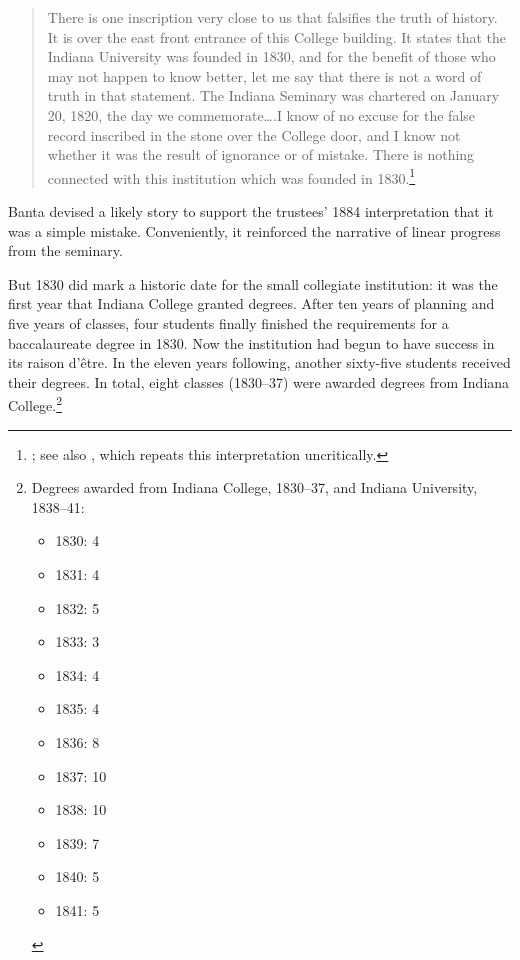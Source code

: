 \documentclass[
  american,
  letterpaper,
]{scrreprt}
\providecommand{\tightlist}{%
  \setlength{\itemsep}{0pt}\setlength{\parskip}{0pt}}\usepackage{longtable,booktabs,array}
\begin{document}
\begin{quote}
There is one inscription very close to us that falsifies the truth of
history. It is over the east front entrance of this College building. It
states that the Indiana University was founded in 1830, and for the
benefit of those who may not happen to know better, let me say that
there is not a word of truth in that statement. The Indiana Seminary was
chartered on January 20, 1820, the day we commemorate\ldots.I know of no
excuse for the false record inscribed in the stone over the College
door, and I know not whether it was the result of ignorance or of
mistake. There is nothing connected with this institution which was
founded in 1830.\footnote{; see also
  , which repeats this interpretation
  uncritically.}
\end{quote}

Banta devised a likely story to support the trustees' 1884
interpretation that it was a simple mistake. Conveniently, it reinforced
the narrative of linear progress from the seminary.

But 1830 did mark a historic date for the small collegiate institution:
it was the first year that Indiana College granted degrees. After ten
years of planning and five years of classes, four students finally
finished the requirements for a baccalaureate degree in 1830. Now the
institution had begun to have success in its raison d'être. In the
eleven years following, another sixty-five students received their
degrees. In total, eight classes (1830--37) were awarded degrees from
Indiana College.\footnote{Degrees awarded from Indiana College,
  1830--37, and Indiana University, 1838--41:

  \begin{itemize}
  \tightlist
  \item
    1830: 4
  \item
    1831: 4
  \item
    1832: 5
  \item
    1833: 3
  \item
    1834: 4
  \item
    1835: 4
  \item
    1836: 8
  \item
    1837: 10
  \item
    1838: 10
  \item
    1839: 7
  \item
    1840: 5
  \item
    1841: 5
  \end{itemize}}
\end{document}
